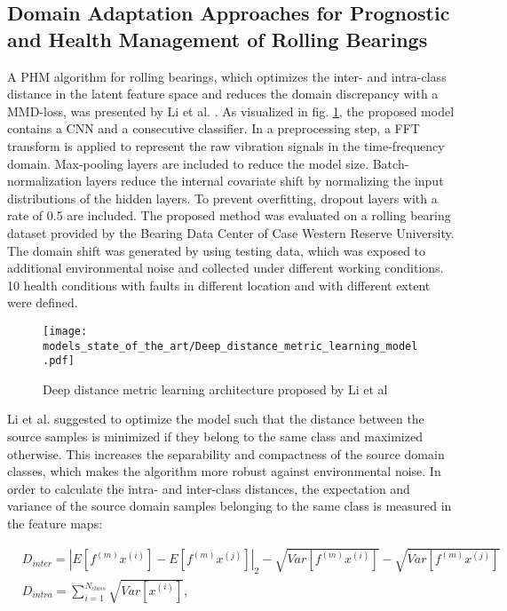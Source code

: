 \subsection{Domain Adaptation Approaches for Prognostic and Health Management of Rolling Bearings}

A PHM algorithm for rolling bearings, which optimizes the inter- and intra-class distance in the latent feature space and reduces the domain discrepancy with a MMD-loss, was presented by Li et al. \cite{Li2018}. As visualized in fig. \ref{fig:Deep_distance_metric_learning_model}, the proposed model contains a CNN and a consecutive classifier. In a preprocessing step, a FFT transform is applied to represent the raw vibration signals in the time-frequency domain. Max-pooling layers are included to reduce the model size. Batch-normalization layers reduce the internal covariate shift by normalizing the input distributions of the hidden layers. To prevent overfitting, dropout layers with a rate of 0.5 are included. The proposed method was evaluated on a rolling bearing dataset provided by the Bearing Data Center of Case Western Reserve University. The domain shift was generated by using testing data, which was exposed to additional environmental noise and collected under different working conditions. 10 health conditions with faults in different location and with different extent were defined. 

\begin{figure}[H]
  \centering
  \texttt{[image: models\_state\_of\_the\_art/Deep\_distance\_metric\_learning\_model.pdf]}
  \caption{Deep distance metric learning architecture proposed by Li et al \cite{Li2018}}
  \label{fig:Deep_distance_metric_learning_model}
\end{figure}

Li et al. \cite{Li2018} suggested to optimize the model such that the distance between the source samples is minimized if they belong to the same class and maximized otherwise. This increases the separability and compactness of the source domain classes, which makes the algorithm more robust against environmental noise. In order to calculate the intra- and inter-class distances, the expectation and variance of the source domain samples belonging to the same class is measured in the feature maps:

\begin{equation}
    \begin{aligned}
       &D_{inter} = |E[f^{(m)}x^{(i)}]-E[f^{(m)}x^{(j)}]|_{2}-\sqrt{Var[f^{(m)}x^{(i)}]}-\sqrt{Var[f^{(m)}x^{(j)}]}\\
       &D_{intra} = 
        \sum_{i=1}^{N_{class}} \sqrt{Var[x^{(i)}]},
    \end{aligned}
\end{equation}

